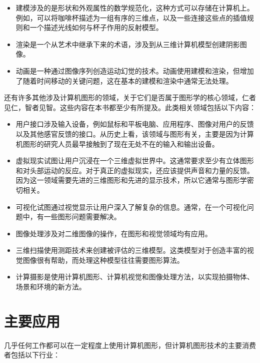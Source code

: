 \documentclass[lang=cn,10pt]{elegantbook}
\begin{document}
\begin{itemize}
\item 建模涉及的是形状和外观属性的数学规范化，这种方式可以存储在计算机上。例如，可以将咖啡杯描述为一组有序的三维点，以及一些连接这些点的插值规则和一个描述光线如何与杯子作用的反射模型。
\item 渲染是一个从艺术中继承下来的术语，涉及到从三维计算机模型创建阴影图像。
\item 动画是一种通过图像序列创造运动幻觉的技术。动画使用建模和渲染，但增加了随着时间移动的关键问题，这在基本的建模和渲染中通常无法处理。
\end{itemize}

还有许多其他涉及计算机图形的领域，关于它们是否属于图形学的核心领域，仁者见仁，智者见智。这些内容在本书都至少有所提及。此类相关领域包括以下内容：
\begin{itemize}
\item 用户接口涉及输入设备，例如鼠标和平板电脑、应用程序、图像对用户的反馈以及其他感官反馈的接口。从历史上看，该领域与图形有关，主要是因为计算机图形的研究人员最早接触到了现在无处不在的输入和输出设备。
\item 虚拟现实试图让用户沉浸在一个三维虚拟世界中。这通常要求至少有立体图形和对头部运动的反应。对于真正的虚拟现实，还应该提供声音和力量的反馈。因为这一领域需要先进的三维图形和先进的显示技术，所以它通常与图形学密切相关。
\item 可视化试图通过视觉显示让用户深入了解复杂的信息。通常，在一个可视化问题中，有一些图形问题需要解决。
\item 图像处理涉及对二维图像的操作，在图形和视觉领域均有应用。
\item 三维扫描使用测距技术来创建被评估的三维模型。这类模型对于创造丰富的视觉图像很有帮助，而处理这种模型往往需要图形算法。
\item 计算摄影是使用计算机图形、计算机视觉和图像处理方法，以实现拍摄物体、场景和环境的新方法。
\end{itemize}

\section{主要应用}

几乎任何工作都可以在一定程度上使用计算机图形，但计算机图形技术的主要消费者包括以下行业：
\end{document}
